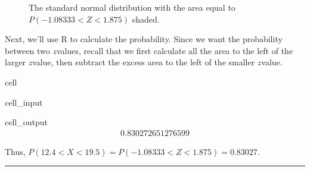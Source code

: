 \documentclass[letterpaper,10pt,english]{jupyterBook}
\begin{document}
\begin{figure}[htbp]
\centering
\capstart

\noindent{}
\caption{The standard normal distribution with the area equal to \(P(-1.08333 < Z < 1.875)\) shaded.}\label{\detokenize{Ch4 The Normal Distribution and the Central Limit Theorem/4.3 The Normal Distribution and z-scores:stdnormal-ex13}}\end{figure}

\sphinxAtStartPar
Next, we’ll use R to calculate the probability. Since we want the probability between two \(z\)\sphinxhyphen{}values, recall that we first calculate all the area to the left of the larger \(z\)\sphinxhyphen{}value, then subtract the excess area to the left of the smaller \(z\)\sphinxhyphen{}value.

\begin{sphinxuseclass}{cell}\begin{sphinxVerbatimInput}

\begin{sphinxuseclass}{cell_input}
\begin{sphinxVerbatim}[commandchars=\\\{\}]
\end{sphinxVerbatim}

\end{sphinxuseclass}\end{sphinxVerbatimInput}
\begin{sphinxVerbatimOutput}

\begin{sphinxuseclass}{cell_output}\begin{equation*}
\begin{split}0.830272651276599\end{split}
\end{equation*}
\end{sphinxuseclass}\end{sphinxVerbatimOutput}

\end{sphinxuseclass}
\sphinxAtStartPar
Thus, \(P(12.4 < X < 19.5) = P(-1.08333 < Z < 1.875) = 0.83027\).


\bigskip\hrule\bigskip
\end{document}
